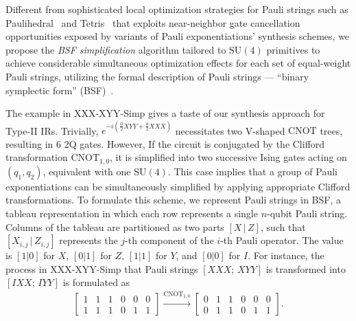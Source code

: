\documentclass[conference]{IEEEtran}
\newcommand{\dquote}[1]{``#1''}
\newcommand{\note}[1]{{\color{blue} #1}}
\newcommand{\CNOT}{\mathrm{CNOT}}
\newcommand{\SUfour}{\mathrm{SU}(4)}
\begin{document}
\note{

    Different from sophisticated local optimization strategies for Pauli strings such as Paulihedral~\cite{li2022paulihedral} and Tetris~\cite{jin2024tetris} that exploits near-neighbor gate cancellation opportunities exposed by variants of Pauli exponentiations' synthesis schemes, we propose the \textit{BSF simplification} algorithm tailored to $\SUfour$ primitives to achieve considerable simultaneous optimization effects for each set of equal-weight Pauli strings, utilizing the formal description of Pauli strings --- \dquote{binary symplectic form} (BSF)~\cite{van2020circuit}. 

    The example in XXX-XYY-Simp gives a taste of our synthesis approach for Type-II IRs. Trivially, $ e^{-i (\frac{\phi}{2}XYY + \frac{\theta}{2}XXX)} $ necessitates two V-shaped $\CNOT$ trees, resulting in 6 2Q gates. However, If the circuit is conjugated by the Clifford transformation $ \CNOT_{1,0} $, it is simplified into two successive Ising gates acting on $(q_1, q_2)$, equivalent with one $ \SUfour $. This case implies that a group of Pauli exponentiations can be simultaneously simplified by applying appropriate Clifford transformations. To formulate this scheme, we represent Pauli strings in BSF, a tableau representation in which each row represents a single $ n $-qubit Pauli string. Columns of the tableau are partitioned as two parts $ [X\,|\,Z] $, such that $ [X_{i,j}\,|\, Z_{i,j}] $ represents the $ j $-th component of the $ i $-th Pauli operator. The value is $ [1 | 0 ] $ for $ X $, $ [0 | 1 ] $ for $ Z $, $ [1 | 1 ] $ for $ Y $, and $ [0 | 0 ] $ for $ I $. For instance, the process in XXX-XYY-Simp that Pauli strings $ [XXX;\, XYY] $ is transformed into $ [IXX;\, IYY] $ is formulated as 
    \begin{align*}
        \left[
            \begin{array}{ccc|ccc}
            1 & 1 & 1 & 0 & 0 & 0 \\
            1 & 1 & 1 & 0 & 1 & 1
            \end{array}
        \right]
        \xrightarrow{\CNOT_{1,0}}
        \left[
            \begin{array}{ccc|ccc}
                0 & 1 & 1 & 0 & 0 & 0 \\
                0 & 1 & 1 & 0 & 1 & 1
            \end{array}
        \right].
    \end{align*}

}
\end{document}

